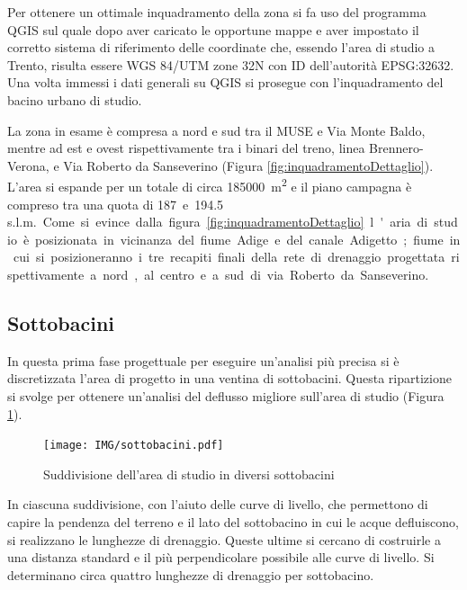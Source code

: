 Per ottenere un ottimale inquadramento della zona si fa uso del programma QGIS sul quale dopo aver caricato le opportune mappe e aver impostato il corretto sistema di riferimento delle coordinate che, essendo l'area di studio a Trento, risulta essere WGS 84/UTM zone 32N con ID dell'autorità EPSG:32632.
Una volta immessi i dati generali su QGIS si prosegue con l'inquadramento del bacino urbano di studio.

La zona in esame è compresa a nord e sud tra il MUSE e Via Monte Baldo, mentre ad est e ovest rispettivamente tra i binari del treno, linea Brennero-Verona, e Via Roberto da Sanseverino (Figura \ref{fig:inquadramentoDettaglio}).
L'area si espande per un totale di circa \SI{185000}{\square\metre} e il piano campagna è compreso tra una quota di \SI{187} e \SI{194.5}{\metre \, s.l.m.}. 

Come si evince dalla figura \ref{fig:inquadramentoDettaglio} l'aria di studio è posizionata in vicinanza del fiume Adige e del canale Adigetto; fiume in cui si posizioneranno i tre recapiti finali della rete di drenaggio progettata rispettivamente a nord, al centro e a sud di via Roberto da Sanseverino.

\subsection{Sottobacini}

In questa prima fase progettuale per eseguire un'analisi più precisa si è discretizzata l'area di progetto in una ventina di sottobacini. 
Questa ripartizione si svolge per ottenere un'analisi del deflusso migliore sull'area di studio (Figura \ref{fig:sottobacini}).

\begin{figure}[p]
    \centering
    \texttt{[image: IMG/sottobacini.pdf]} 
    \caption{Suddivisione dell'area di studio in diversi sottobacini}
    \label{fig:sottobacini}
\end{figure}

In ciascuna suddivisione, con l'aiuto delle curve di livello, che permettono di capire la pendenza del terreno e il lato del sottobacino in cui le acque defluiscono, si realizzano le lunghezze di drenaggio. 
Queste ultime si cercano di costruirle a una distanza standard e il più perpendicolare possibile alle curve di livello.
Si determinano circa quattro lunghezze di drenaggio per sottobacino.

